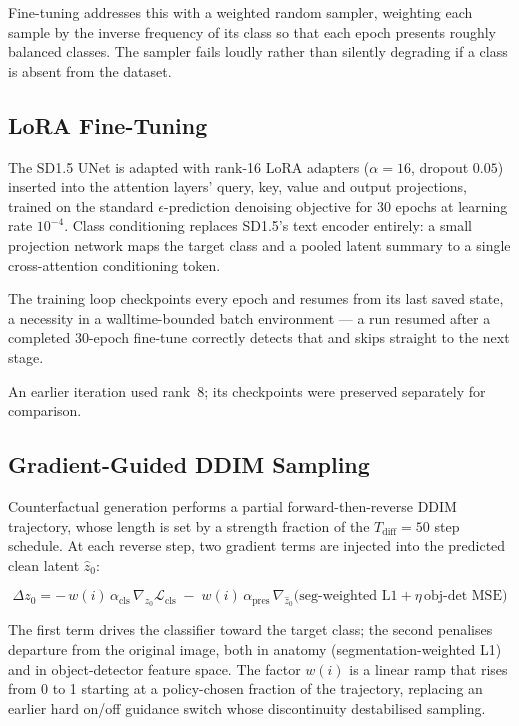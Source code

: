 Fine-tuning addresses this with a weighted random sampler, weighting each
sample by the inverse frequency of its class so that each epoch presents
roughly balanced classes. The sampler fails loudly rather than silently
degrading if a class is absent from the dataset.

\subsection{LoRA Fine-Tuning}

The SD1.5 UNet is adapted with rank-16 LoRA adapters ($\alpha = 16$,
dropout $0.05$) inserted into the attention layers' query, key, value
and output projections, trained on the standard $\epsilon$-prediction
denoising objective for 30 epochs at learning rate $10^{-4}$. Class
conditioning replaces SD1.5's text encoder entirely: a small projection
network maps the target class and a pooled latent summary to a single
cross-attention conditioning token.

The training loop checkpoints every epoch and resumes from its last
saved state, a necessity in a walltime-bounded batch environment --- a
run resumed after a completed 30-epoch fine-tune correctly detects that
and skips straight to the next stage.

An earlier iteration used rank~8; its checkpoints were preserved
separately for comparison.

\subsection{Gradient-Guided DDIM Sampling}

Counterfactual generation performs a partial forward-then-reverse DDIM
trajectory, whose length is set by a strength fraction of the
$T_{\text{diff}}=50$ step schedule. At each reverse step, two gradient
terms are injected into the predicted clean latent $\hat z_0$:

\[
  \Delta z_0 = -\,w(i)\,\alpha_{\text{cls}}\,
  \nabla_{\hat z_0}\mathcal{L}_{\text{cls}}
  \;-\; w(i)\,\alpha_{\text{pres}}\,\nabla_{\hat z_0}
  \big(\text{seg-weighted L1} + \eta\,\text{obj-det MSE}\big)
\]

The first term drives the classifier toward the target class; the second
penalises departure from the original image, both in anatomy
(segmentation-weighted L1) and in object-detector feature space. The
factor $w(i)$ is a linear ramp that rises from 0 to 1 starting at a
policy-chosen fraction of the trajectory, replacing an earlier hard
on/off guidance switch whose discontinuity destabilised sampling.

